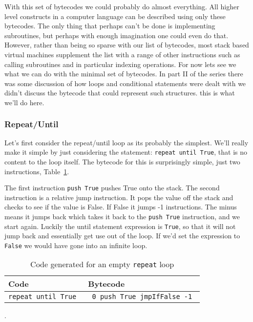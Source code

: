 With this set of bytecodes we could probably do almost everything. All higher level constructs in a computer language can be described using only these bytecodes. The only thing that perhaps can't be done is implementing subroutines, but perhaps with enough imagination one could even do that. However, rather than being so sparse with our list of bytecodes, most stack based virtual machines supplement the list with a range of other instructions such as calling subroutines and in particular indexing operations. For now lets see we what we can do with the minimal set of bytecodes. In part II of the series there was some discussion of how loops and conditional statements were dealt with we didn't discuss the bytecode that could represent such structures. this is what we'll do here.

\subsubsection*{Repeat/Until}

Let's first consider the repeat/until loop as its probably the simplest. We'll really make it simple by just considering the statement: {\tt repeat until True}, that is no content to the loop itself. The bytecode for this is surprisingly simple, just two instructions, Table~\ref{code:repeatempty}.

The first instruction {\tt push True} pushes True onto the stack. The second instruction is a relative jump instruction. It pops the value off the stack and checks to see if the value is False. If False it jumps -1 instructions. The minus means it jumps back which takes it back to the {\tt push True} instruction, and we start again. Luckily the until statement expression is {\tt True}, so that it will not jump back and essentially get use out of the loop. If we'd set the expression to {\tt False} we would have gone into an infinite loop.


\begin{table}
\centering
\begingroup\setlength{\fboxsep}{0pt}
\colorbox{mylightgray}{%
\begin{tabular}{p{4.6cm}p{4.6cm}} \toprule
Code & Bytecode  \\ \midrule
{\tt repeat \linebreak
until True \linebreak} & {\tt
  0  push True \linebreak
  1  jmpIfFalse -1 \linebreak
}  \\ \bottomrule
\end{tabular}}\endgroup
\caption{Code generated for an empty {\tt repeat} loop}.
\label{code:repeatempty}
\end{table}

